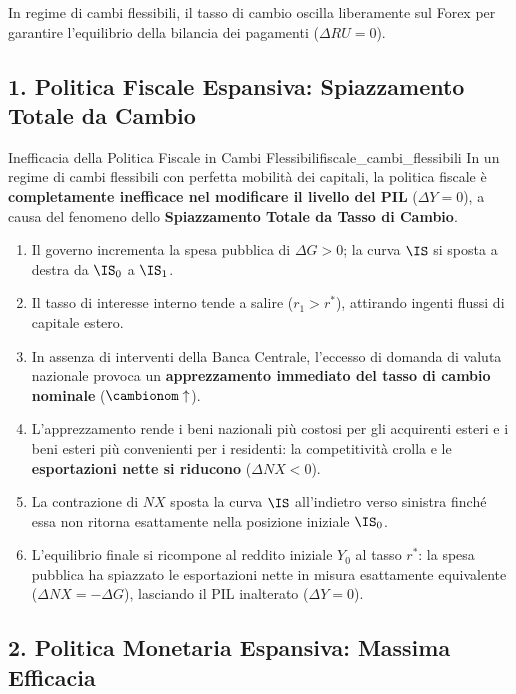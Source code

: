 In regime di cambi flessibili, il tasso di cambio oscilla liberamente sul Forex per garantire l'equilibrio della bilancia dei pagamenti ($\Delta RU = 0$).

\subsection{1. Politica Fiscale Espansiva: Spiazzamento Totale da Cambio}

\begin{teorema}{Inefficacia della Politica Fiscale in Cambi Flessibili}{fiscale_cambi_flessibili}
In un regime di cambi flessibili con perfetta mobilità dei capitali, la politica fiscale è \textbf{completamente inefficace nel modificare il livello del PIL} ($\Delta Y = 0$), a causa del fenomeno dello \textbf{Spiazzamento Totale da Tasso di Cambio}.
\end{teorema}

\begin{dimostrazione}
\begin{enumerate}
    \item Il governo incrementa la spesa pubblica di $\Delta G > 0$; la curva $\IS$ si sposta a destra da $\IS_0$ a $\IS_1$.
    \item Il tasso di interesse interno tende a salire ($r_1 > r^*$), attirando ingenti flussi di capitale estero.
    \item In assenza di interventi della Banca Centrale, l'eccesso di domanda di valuta nazionale provoca un \textbf{apprezzamento immediato del tasso di cambio nominale} ($\cambionom \uparrow$).
    \item L'apprezzamento rende i beni nazionali più costosi per gli acquirenti esteri e i beni esteri più convenienti per i residenti: la competitività crolla e le \textbf{esportazioni nette si riducono} ($\Delta NX < 0$).
    \item La contrazione di $NX$ sposta la curva $\IS$ all'indietro verso sinistra finché essa non ritorna esattamente nella posizione iniziale $\IS_0$.
    \item L'equilibrio finale si ricompone al reddito iniziale $Y_0$ al tasso $r^*$: la spesa pubblica ha spiazzato le esportazioni nette in misura esattamente equivalente ($\Delta NX = -\Delta G$), lasciando il PIL inalterato ($\Delta Y = 0$).
\end{enumerate}
\end{dimostrazione}

\subsection{2. Politica Monetaria Espansiva: Massima Efficacia}

